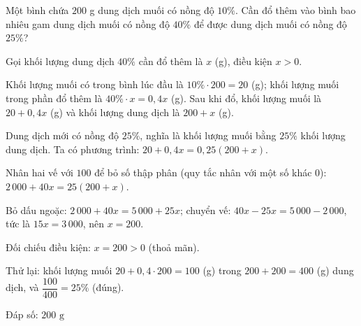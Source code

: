 \begin{problem}[8DS-PT1-045]
Một bình chứa $200$ g dung dịch muối có nồng độ $10\%$. Cần đổ thêm vào bình bao nhiêu gam dung dịch muối có nồng độ $40\%$ để được dung dịch muối có nồng độ $25\%$?

\begin{solution}
Gọi khối lượng dung dịch $40\%$ cần đổ thêm là $x$ (g), điều kiện $x > 0$.

Khối lượng muối có trong bình lúc đầu là $10\% \cdot 200 = 20$ (g); khối lượng muối trong phần đổ thêm là $40\% \cdot x = 0{,}4x$ (g). Sau khi đổ, khối lượng muối là $20 + 0{,}4x$ (g) và khối lượng dung dịch là $200 + x$ (g).

Dung dịch mới có nồng độ $25\%$, nghĩa là khối lượng muối bằng $25\%$ khối lượng dung dịch. Ta có phương trình: $20 + 0{,}4x = 0{,}25(200 + x)$.

Nhân hai vế với $100$ để bỏ số thập phân (quy tắc nhân với một số khác $0$): $2\,000 + 40x = 25(200 + x)$.

Bỏ dấu ngoặc: $2\,000 + 40x = 5\,000 + 25x$; chuyển vế: $40x - 25x = 5\,000 - 2\,000$, tức là $15x = 3\,000$, nên $x = 200$.

Đối chiếu điều kiện: $x = 200 > 0$ (thoả mãn).

Thử lại: khối lượng muối $20 + 0{,}4 \cdot 200 = 100$ (g) trong $200 + 200 = 400$ (g) dung dịch, và $\dfrac{100}{400} = 25\%$ (đúng).

Đáp số: $\boxed{200 \text{ g}}$
\end{solution}
\end{problem}

